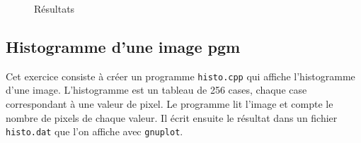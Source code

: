 \documentclass[11pt]{article}
\begin{document}
\begin{figure}[!htb]
  \centering
  \caption{Résultats}
\end{figure}

\FloatBarrier

\clearpage
\subsection{Histogramme d'une image pgm}
Cet exercice consiste à créer un programme \texttt{histo.cpp} qui affiche l'histogramme d'une image. L'histogramme est un tableau de 256 cases, chaque case correspondant à une valeur de pixel. Le programme lit l'image et compte le nombre de pixels de chaque valeur. Il écrit ensuite le résultat dans un fichier \texttt{histo.dat} que l'on affiche avec \texttt{gnuplot}.
\end{document}

